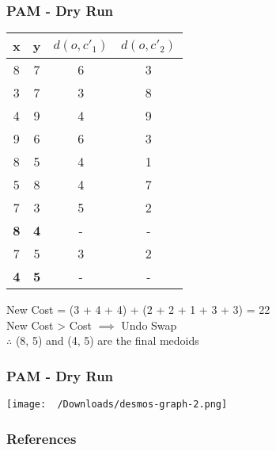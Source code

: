 \documentclass{beamer}
\begin{document}
\begin{frame}
    \frametitle{PAM - Dry Run}
    \begin{table}[h!]
        \centering
        \begin{tabular}{|c c c c|} 
             \hline
             x & y & $d(o, {c'}_1)$ & $d(o, {c'}_2)$ \\
             \hline
             8 & 7 & 6 & 3\\
             3 & 7 & 3 & 8\\
             4 & 9 & 4 & 9\\
             9 & 6 & 6 & 3\\
             8 & 5 & 4 & 1\\
             5 & 8 & 4 & 7\\
             7 & 3 & 5 & 2\\
             \textbf 8 & \textbf 4 & - & -\\
             7 & 5 & 3 & 2\\
             \textbf 4 & \textbf 5 & - & -\\
             \hline
        \end{tabular}
    \end{table}
    
    \centering New Cost = (3 + 4 + 4) + (2 + 2 + 1 + 3 + 3) = 22\\
    \centering New Cost > Cost $\implies$ Undo Swap\\
    \centering $\therefore$ (8, 5) and (4, 5) are the final medoids
\end{frame}

\begin{frame}
    \frametitle{PAM - Dry Run}
    \centering \texttt{[image: ~/Downloads/desmos-graph-2.png]}
\end{frame}

\begin{frame}
    \frametitle{References}
    \nocite{*}
    \printbibliography 
\end{frame}
\end{document}
